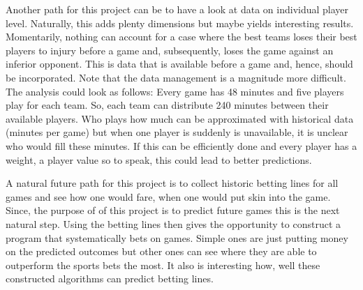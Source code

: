 \documentclass[11pt, a4paper, leqno]{article}
\begin{document}
Another path for this project can be to have a look at data on individual player level. Naturally, this adds plenty dimensions but maybe yields interesting results. Momentarily, nothing can account for a case where the best teams loses their best players to injury before a game and, subsequently, loses the game against an inferior opponent. This is data that is available before a game and, hence, should be incorporated. Note that the data management is a magnitude more difficult. The analysis could look as follows: Every game has 48 minutes and five players play for each team. So, each team can distribute 240 minutes between their available players. Who plays how much can be approximated with historical data (minutes per game) but when one player is suddenly is unavailable, it is unclear who would fill these minutes. If this can be efficiently done and every player has a weight, a player value so to speak, this could lead to better predictions.

A natural future path for this project is to collect historic betting lines for all games and see how one would fare, when one would put skin into the game. Since, the purpose of of this project is to predict future games this is the next natural step. Using the betting lines then gives the opportunity to construct a program that systematically bets on games. Simple ones are just putting money on the predicted outcomes but other ones can see where they are able to outperform the sports bets the most. It also is interesting how, well these constructed algorithms can predict betting lines.



\end{document}
